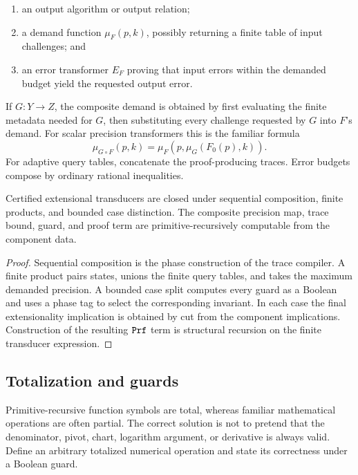 \begin{enumerate}
\item an output algorithm or output relation;
\item a demand function \(\mu_F(p,k)\), possibly returning a finite table of
      input challenges; and
\item an error transformer \(E_F\) proving that input errors within the
      demanded budget yield the requested output error.
\end{enumerate}

If \(G:Y\to Z\), the composite demand is obtained by first evaluating the
finite metadata needed for \(G\), then substituting every challenge requested
by \(G\) into \(F\)'s demand.  For scalar precision transformers this is the
familiar formula
\[
 \mu_{G\circ F}(p,k)=\mu_F(p,\mu_G(F_0(p),k)).
\]
For adaptive query tables, concatenate the proof-producing traces.  Error
budgets compose by ordinary rational inequalities.

\begin{theorem}
\label{thm:precision-composition}
Certified extensional transducers are closed under sequential composition,
finite products, and bounded case distinction.  The composite precision map,
trace bound, guard, and proof term are primitive-recursively computable from
the component data.
\end{theorem}

\begin{proof}
Sequential composition is the phase construction of the trace compiler.  A
finite product pairs states, unions the finite query tables, and takes the
maximum demanded precision.  A bounded case split computes every guard as a
Boolean and uses a phase tag to select the corresponding invariant.  In each
case the final extensionality implication is obtained by cut from the
component implications.  Construction of the resulting \(\texttt{Prf}\) term is
structural recursion on the finite transducer expression.
\end{proof}

\subsection{Totalization and guards}

Primitive-recursive function symbols are total, whereas familiar
mathematical operations are often partial.  The correct solution is not to
pretend that the denominator, pivot, chart, logarithm argument, or derivative
is always valid.  Define an arbitrary totalized numerical operation and state
its correctness under a Boolean guard.

